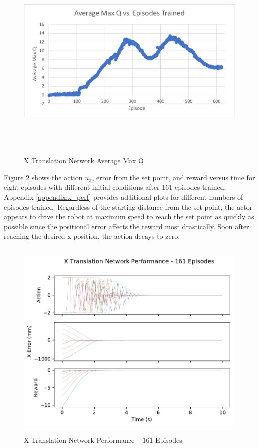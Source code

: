 \begin{figure}[H]
	\centering
	\includegraphics[width=6in, height=3.85in, keepaspectratio]{figures/train_figs/x_q.pdf}
	\caption{X Translation Network Average Max Q} \label{fig:x_q}
\end{figure}

Figure \ref{fig:x_perf} shows the action $u_x$, error from the set point, and reward versus time for eight episodes with different initial conditions after 161 episodes trained. Appendix \ref{appendix:x_perf} provides additional plots for different numbers of episodes trained. Regardless of the starting distance from the set point, the actor appears to drive the robot at maximum speed to reach the set point as quickly as possible since the positional error affects the reward most drastically. Soon after reaching the desired x position, the action decays to zero.
\begin{figure}[H]
	\centering
	\includegraphics[width=6in, height=3.85in, keepaspectratio]{figures/train_figs/transx_transitions/1_161.pdf}
	\caption{X Translation Network Performance -- 161 Episodes}\label{fig:x_perf}
\end{figure}

